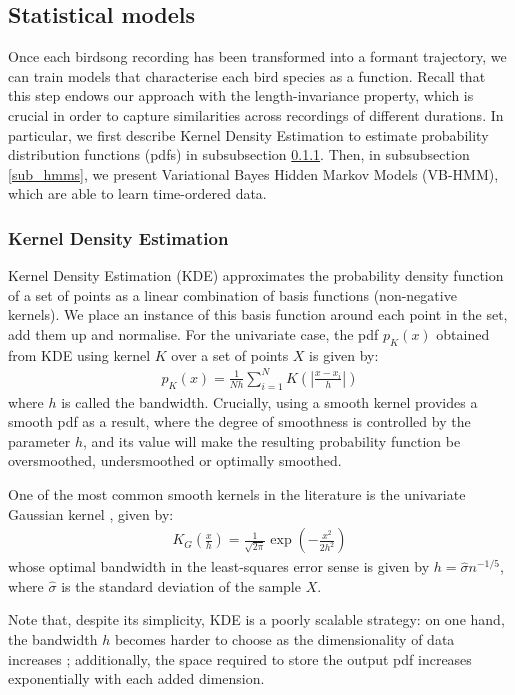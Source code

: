 \documentclass[pdftex,11pt,a4paper]{article}
\theoremstyle{definition}
\theoremstyle{remark}
\begin{document}
\subsection{Statistical models}
Once each birdsong recording has been transformed into a formant trajectory, we can train models that characterise each bird species as a function. Recall that this step endows our approach with the length-invariance property, which is crucial in order to capture similarities across recordings of different durations. In particular, we first describe Kernel Density Estimation to estimate probability distribution functions (pdfs) in subsubsection \ref{sub_kde}. Then, in subsubsection \ref{sub_hmms}, we present Variational Bayes Hidden Markov Models (VB-HMM), which are able to learn time-ordered data. 

\subsubsection{Kernel Density Estimation}
\label{sub_kde}
\par Kernel Density Estimation (KDE) approximates the probability density function of a set of points as a linear combination of basis functions (non-negative kernels). We place an instance of this basis function around each point in the set, add them up and normalise. For the univariate case, the pdf $p_K(x)$ obtained from KDE using kernel $K$ over a set of points $X$ is given by:
\begin{align*}
p_K(x) = \frac{1}{Nh}\sum_{i=1}^NK\left(\left|\frac{x - x_i}{h}\right|\right)
\end{align*}
where $h$ is called the bandwidth. Crucially, using a smooth kernel provides a smooth pdf as a result, where the degree of smoothness is controlled by the parameter $h$, and its value will make the resulting probability function be oversmoothed, undersmoothed or optimally smoothed.
\par One of the most common smooth kernels in the literature is the univariate Gaussian kernel \cite{hastie2008}, given by:
\begin{align*}
K_G\left(\frac{x}{h}\right) = \frac{1}{\sqrt{2\pi}}\exp{\left(-\frac{x^2}{2h^2}\right)}
\end{align*}
whose optimal bandwidth in the least-squares error sense is given by $h = \hat{\sigma}n^{-1/5}$, where $\hat{\sigma}$ is the standard deviation of the sample $X$.
\par Note that, despite its simplicity, KDE is a poorly scalable strategy: on one hand, the bandwidth $h$ becomes harder to choose as the dimensionality of data increases \cite{Hansen2009}; additionally, the space required to store the output pdf increases exponentially with each added dimension.
\end{document}
